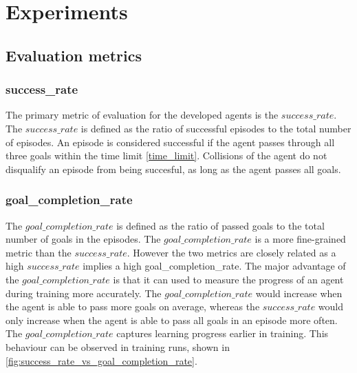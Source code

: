 \chapter{Experiments}
\label{cha:Experiments}

\section{Evaluation metrics}

\subsection{success\_rate}
The primary metric of evaluation for the developed agents is the $success\_rate$. The $success\_rate$ is defined as the ratio of successful episodes to the total number of episodes. An episode is considered successful if the agent passes through all three goals within the time limit \ref{time_limit}. Collisions of the agent do not disqualify an episode from being succesful, as long as the agent passes all goals.

\subsection{goal\_completion\_rate}

The $goal\_completion\_rate$ is defined as the ratio of passed goals to the total number of goals in the episodes. The $goal\_completion\_rate$ is a more fine-grained metric than the $success\_rate$. However the two metrics are closely related as a high $success\_rate$ implies a high goal\_completion\_rate. The major advantage of the $goal\_completion\_rate$ is that it can used to measure the progress of an agent during training more accurately. 
The $goal\_completion\_rate$ would increase when the agent is able to pass more goals on average, whereas the $success\_rate$ would only increase when the agent is able to pass all goals in an episode more often. The $goal\_completion\_rate$ captures learning progress earlier in training. This behaviour can be observed in training runs, shown in \ref{fig:success_rate_vs_goal_completion_rate}.


